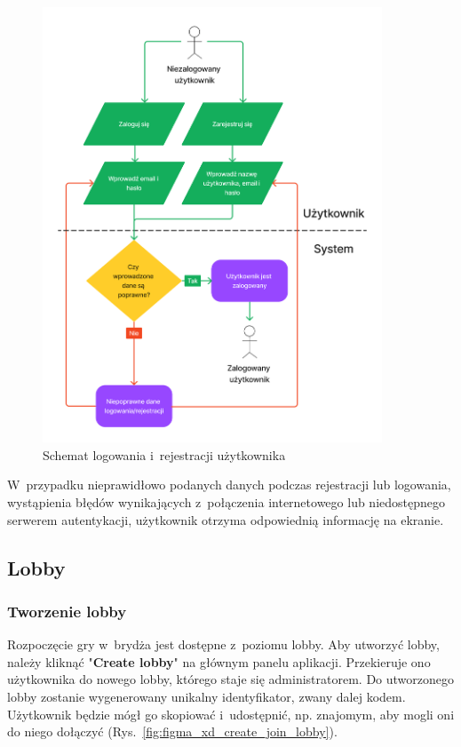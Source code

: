 \begin{figure}[hbt!]
    \centering
    \includegraphics[width=0.9\textwidth]{img/schematy/login.png}
    \caption{Schemat logowania i~rejestracji użytkownika}
    \label{fig:figma_xd_login}
\end{figure}

W~przypadku nieprawidłowo podanych danych podczas rejestracji
lub logowania, wystąpienia błędów wynikających z~połączenia internetowego lub
niedostępnego serwerem autentykacji, użytkownik otrzyma odpowiednią
informację na ekranie.

\FloatBarrier


\subsection{Lobby}

\subsubsection{Tworzenie lobby}

Rozpoczęcie gry w~brydża jest dostępne z~poziomu lobby. Aby utworzyć
lobby, należy kliknąć "\textbf{Create lobby}"\xspace na głównym panelu
aplikacji. Przekieruje ono użytkownika do nowego lobby, którego staje
się administratorem. Do utworzonego lobby zostanie wygenerowany
unikalny identyfikator, zwany dalej kodem. Użytkownik będzie mógł go skopiować
i~udostępnić, np. znajomym, aby mogli oni do niego dołączyć (Rys.~\ref{fig:figma_xd_create_join_lobby}).


